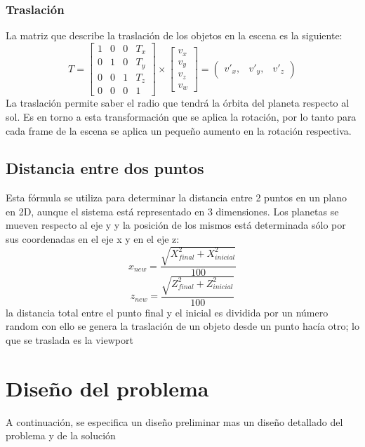 \documentclass[12pt,journal,compsoc]{IEEEtran}
\begin{document}
\subsubsection{Traslación}
La matriz que describe la traslación de los objetos en la escena es la siguiente:\\

\[ 
	T = \left[ 
			\begin{array}{cccc}
				1 & 0 & 0 & T_{x} \\
				0 & 1 & 0 & T_{y} \\
				0 & 0 & 1 & T_{z} \\
				0 & 0 & 0 & 1 
			\end{array}
		\right] \times 
		\left[ 
			\begin{array}{c}
				v_{x} \\
				v_{y} \\
				v_{z} \\
				v_{w} 
			\end{array}
		\right] = 
		\left(
			\begin{array}{ccc}
				v'_{x} , & v'_{y} , & v'_{z}
			\end{array}
		\right)
\]
La traslación permite saber el radio que tendrá la órbita del planeta respecto al sol. Es en torno a esta transformación que se aplica la rotación, por lo tanto para cada frame de la escena se aplica un pequeño aumento en la rotación respectiva.\\
\subsection{Distancia entre dos puntos}
Esta fórmula se utiliza para determinar la distancia entre 2 puntos en un plano en 2D, aunque el sistema está representado en 3 dimensiones. Los planetas se mueven respecto al eje y y la posición de los mismos está determinada sólo por sus coordenadas en el eje x y en el eje z:\\
\[ 
	x_{new} = \frac{\sqrt{X_{final}^{2}+X_{inicial}^{2}}}{100} 
\]
\newline
\[
	z_{new} = \frac{\sqrt{Z_{final}^{2}+Z_{inicial}^{2}}}{100}
\]
\newline
la distancia total entre el punto final y el inicial es dividida por un número random con ello se genera la traslación de un objeto desde un punto hacía otro; lo que se traslada es la viewport
\section{Diseño del problema}
A continuación, se especifica un diseño preliminar mas un diseño detallado del problema y de la solución
\end{document}

